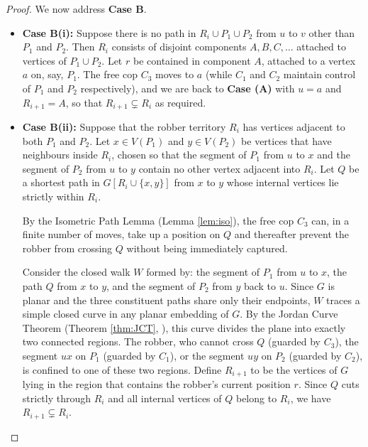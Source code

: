 \documentclass[12pt, a4paper]{article}
\begin{document}
\begin{proof}
We now address \textbf{Case B}.
\begin{itemize}
    \item \textbf{Case B(i):} Suppose there is no path in $R_i \cup P_1 \cup P_2$ 
from $u$ to $v$ other than $P_1$ and $P_2$. Then $R_i$ consists of disjoint 
components $A, B, C, \ldots$ attached to vertices of $P_1 \cup P_2$. Let $r$ be contained in component $A$, attached to a vertex $a$ 
on, say, $P_1$. The free cop $C_3$ moves to $a$ (while $C_1$ and $C_2$ 
maintain control of $P_1$ and $P_2$ respectively), and we are back to 
\textbf{Case (A)} with $u = a$ and $R_{i+1} = A$, so that $R_{i+1} \subsetneq R_i$ as required.

    \item \textbf{Case B(ii):} Suppose that the robber territory $R_i$ has vertices adjacent to
    both $P_1$ and $P_2$. Let $x \in V(P_1)$ and $y \in V(P_2)$ be vertices that have
    neighbours inside $R_i$, chosen so that the segment of $P_1$ from $u$ to $x$ and the
    segment of $P_2$ from $u$ to $y$ contain no other vertex adjacent into $R_i$. Let $Q$
    be a shortest path in $G[R_i \cup \{x,y\}]$ from $x$ to $y$ whose internal vertices lie
    strictly within $R_i$.

    By the Isometric Path Lemma (Lemma \ref{lem:iso}), the free cop $C_3$ can, in a finite
    number of moves, take up a position on $Q$ and thereafter prevent the robber from
    crossing $Q$ without being immediately captured.

    Consider the closed walk $W$ formed by: the segment of $P_1$ from $u$ to $x$,
    the path $Q$ from $x$ to $y$, and the segment of $P_2$ from $y$ back to $u$.
    Since $G$ is planar and the three constituent paths share only their endpoints,
    $W$ traces a simple closed curve in any planar embedding of $G$. By the Jordan
    Curve Theorem (Theorem \ref{thm:JCT}, \cite{tverberg1980jordan}), this curve divides the plane
    into exactly two connected regions. The robber, who cannot cross $Q$ (guarded by
    $C_3$), the segment $ux$ on $P_1$ (guarded by $C_1$), or the segment $uy$ on $P_2$
    (guarded by $C_2$), is confined to one of these two regions. Define $R_{i+1}$ to be
    the vertices of $G$ lying in the region that contains the robber's current position
    $r$. Since $Q$ cuts strictly through $R_i$ and all internal vertices of $Q$ belong to
    $R_i$, we have $R_{i+1} \subsetneq R_i$.


\end{itemize}
\end{proof}
\end{document}
